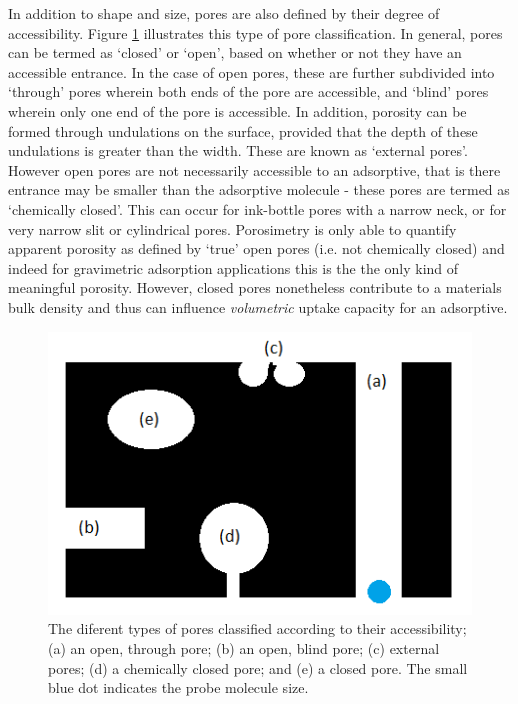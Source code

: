 In addition to shape and size, pores are also defined by their degree of accessibility. Figure \ref{fig:pore_accessibility} illustrates this type of pore classification. In general, pores can be termed as `closed' or `open', based on whether or not they have an accessible entrance. In the case of open pores, these are further subdivided into `through' pores wherein both ends of the pore are accessible, and `blind' pores wherein only one end of the pore is accessible. In addition, porosity can be formed through undulations on the surface, provided that the depth of these undulations is greater than the width. These are known as `external pores'. However open pores are not necessarily accessible to an adsorptive, that is there entrance may be smaller than the adsorptive molecule - these pores are termed as `chemically closed'. This can occur for ink-bottle pores with a narrow neck, or for very narrow slit or cylindrical pores.\citep{rouquerol1994recommendations, kaneko1994determination, zdravkov2007pore} Porosimetry is only able to quantify apparent porosity as defined by `true' open pores (i.e. not chemically closed) and indeed for gravimetric adsorption applications this is the the only kind of meaningful porosity. However, closed pores nonetheless contribute to a materials bulk density and thus can influence \textit{volumetric} uptake capacity for an adsorptive.

\begin{figure}[t!]
    \centering
    \includegraphics[width=\columnwidth, keepaspectratio]{1-introduction/figs/pore_accessibility.png}
    \caption{The diferent types of pores classified according to their accessibility; (a) an open, through pore; (b) an open, blind pore; (c) external pores; (d) a chemically closed pore; and (e) a closed pore. The small blue dot indicates the probe molecule size.}
    \label{fig:pore_accessibility}
\end{figure}

